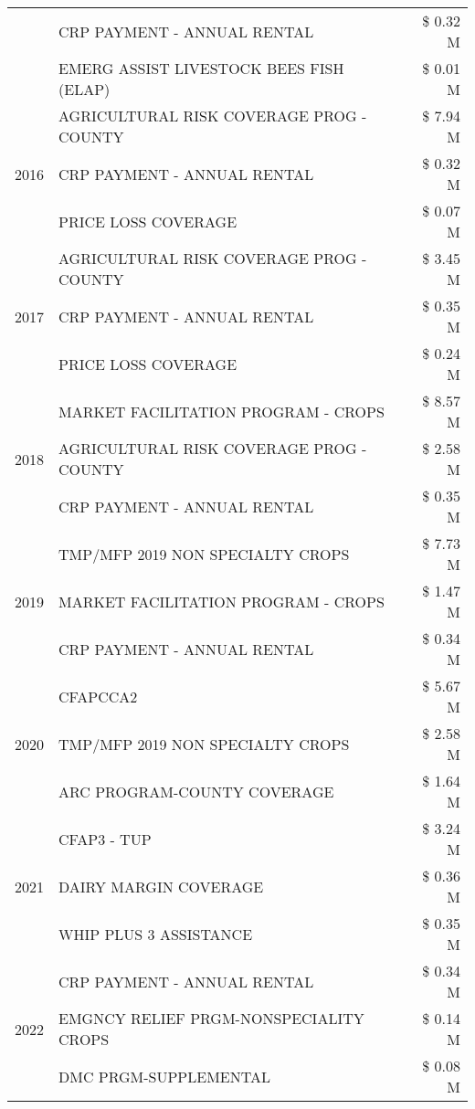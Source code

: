 \begin{tabular}{llr}
 & CRP PAYMENT - ANNUAL RENTAL & \$ 0.32 M \\
 & EMERG ASSIST LIVESTOCK BEES FISH (ELAP) & \$ 0.01 M \\
\cline{1-3}
\multirow[t]{3}{*}{2016} & AGRICULTURAL RISK COVERAGE PROG - COUNTY & \$ 7.94 M \\
 & CRP PAYMENT - ANNUAL RENTAL & \$ 0.32 M \\
 & PRICE LOSS COVERAGE & \$ 0.07 M \\
\cline{1-3}
\multirow[t]{3}{*}{2017} & AGRICULTURAL RISK COVERAGE PROG - COUNTY & \$ 3.45 M \\
 & CRP PAYMENT - ANNUAL RENTAL & \$ 0.35 M \\
 & PRICE LOSS COVERAGE & \$ 0.24 M \\
\cline{1-3}
\multirow[t]{3}{*}{2018} & MARKET FACILITATION PROGRAM - CROPS & \$ 8.57 M \\
 & AGRICULTURAL RISK COVERAGE PROG - COUNTY & \$ 2.58 M \\
 & CRP PAYMENT - ANNUAL RENTAL & \$ 0.35 M \\
\cline{1-3}
\multirow[t]{3}{*}{2019} & TMP/MFP 2019 NON SPECIALTY CROPS & \$ 7.73 M \\
 & MARKET FACILITATION PROGRAM - CROPS & \$ 1.47 M \\
 & CRP PAYMENT - ANNUAL RENTAL & \$ 0.34 M \\
\cline{1-3}
\multirow[t]{3}{*}{2020} & CFAPCCA2 & \$ 5.67 M \\
 & TMP/MFP 2019 NON SPECIALTY CROPS & \$ 2.58 M \\
 & ARC PROGRAM-COUNTY COVERAGE & \$ 1.64 M \\
\cline{1-3}
\multirow[t]{3}{*}{2021} & CFAP3 - TUP & \$ 3.24 M \\
 & DAIRY MARGIN COVERAGE & \$ 0.36 M \\
 & WHIP PLUS 3 ASSISTANCE & \$ 0.35 M \\
\cline{1-3}
\multirow[t]{3}{*}{2022} & CRP PAYMENT - ANNUAL RENTAL & \$ 0.34 M \\
 & EMGNCY RELIEF PRGM-NONSPECIALITY CROPS & \$ 0.14 M \\
 & DMC PRGM-SUPPLEMENTAL & \$ 0.08 M \\
\cline{1-3}
\bottomrule
\end{tabular}
